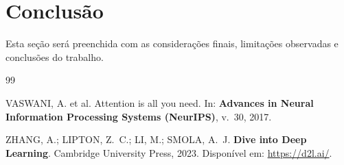 \documentclass[
	12pt,
	a4paper,
	article,
	twocolumn
]{abntex2}
\begin{document}
\section{Conclusão}

Esta seção será preenchida com as considerações finais, limitações observadas e conclusões do trabalho.

\begin{thebibliography}{99}

VASWANI, A. et al. Attention is all you need. In: \textbf{Advances in Neural Information Processing Systems (NeurIPS)}, v.~30, 2017.

ZHANG, A.; LIPTON, Z.~C.; LI, M.; SMOLA, A.~J. \textbf{Dive into Deep Learning}. Cambridge University Press, 2023. Disponível em: \url{https://d2l.ai/}.

\end{thebibliography}
\end{document}
